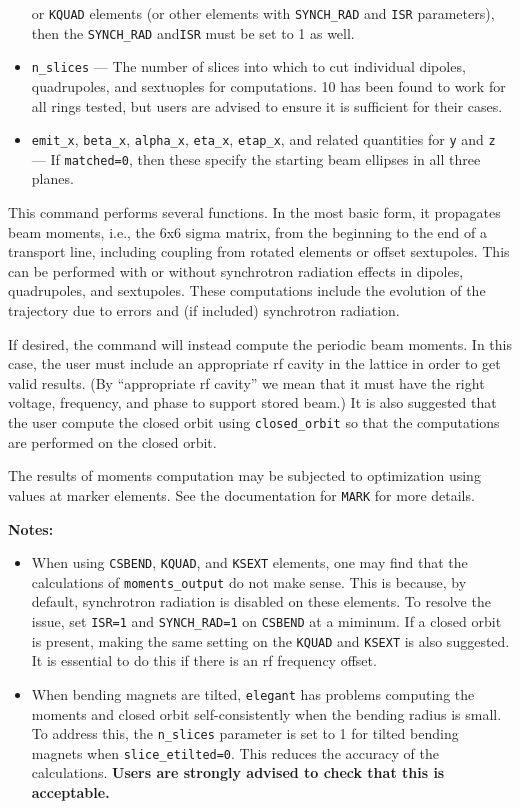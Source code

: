 \documentclass[11pt]{article}
\begin{document}
\begin{itemize}
  or \verb|KQUAD| elements (or other elements with \verb|SYNCH_RAD| and \verb|ISR| parameters), then the \verb|SYNCH_RAD| and\verb|ISR| must be set to 1 as well.
\item \verb|n_slices| --- The number of slices into which to cut individual dipoles, quadrupoles, and sextuoples for computations.
  10 has been found to work for all rings tested, but users are advised to ensure it is sufficient for their cases.
\item \verb|emit_x|, \verb|beta_x|, \verb|alpha_x|, \verb|eta_x|, \verb|etap_x|, and related quantities for \verb|y| and \verb|z| ---
  If \verb|matched=0|, then these specify the starting beam ellipses in all three planes.
\end{itemize}

This command performs several functions.  In the most basic form, it
propagates beam moments, i.e., the 6x6 sigma matrix, from the
beginning to the end of a transport line, including coupling from
rotated elements or offset sextupoles. This can be performed with or
without synchrotron radiation effects in dipoles, quadrupoles, and sextupoles.
These computations
include the evolution of the trajectory due to errors and (if included)
synchrotron radiation.

If desired, the command will instead compute the periodic beam
moments.  In this case, the user must include an appropriate rf cavity
in the lattice in order to get valid results.  (By ``appropriate rf
cavity'' we mean that it must have the right voltage, frequency, and
phase to support stored beam.)  It is also suggested that the user
compute the closed orbit using \verb|closed_orbit| so that the
computations are performed on the closed orbit.

The results of moments computation may be subjected to optimization
using values at marker elements.  See the documentation for
\verb|MARK| for more details.

{\bf Notes:} 
\begin{itemize}
\item  When using \verb|CSBEND|, \verb|KQUAD|, and \verb|KSEXT| elements, one may find that the 
calculations of \verb|moments_output| do not make sense. This is because, by default, synchrotron
radiation is disabled on these elements. To resolve the issue, set \verb|ISR=1| and \verb|SYNCH_RAD=1|
on  \verb|CSBEND| at a miminum. If a closed orbit is present, making the same setting on 
the  \verb|KQUAD| and \verb|KSEXT| is also suggested. It is essential to do this if there is
an rf frequency offset.
\item When bending magnets are tilted, \verb|elegant| has problems computing the moments and
closed orbit self-consistently when the bending radius is small.  To address this, the \verb|n_slices| parameter is set to 1 for
tilted bending magnets when \verb|slice_etilted=0|. This reduces the accuracy of the calculations.
{\bf Users are strongly advised to check that this is acceptable.} 
\end{itemize}
\end{document}
